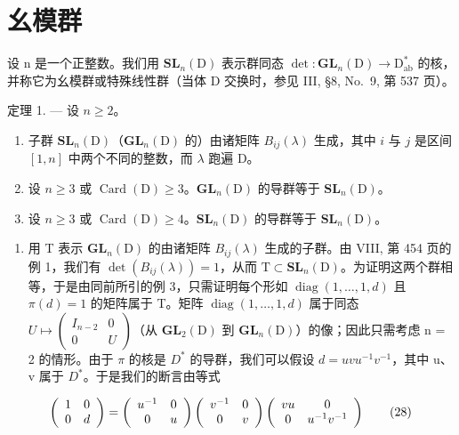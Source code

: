 \section{幺模群}

设 n 是一个正整数。我们用 \(\mathbf{SL}_{n}(\mathrm{D})\) 表示群同态 \(\det: \mathbf{GL}_{n}(\mathrm{D}) \to \mathrm{D}_{\mathrm{ab}}^{*}\) 的核，并称它为幺模群或特殊线性群（当体 D 交换时，参见 III, §8, No.~9, 第 537 页）。

定理 1. --- 设 \(n \geqslant 2\)。

\begin{enumerate}
\def\labelenumi{\alph{enumi})}
\item
  子群 \(\mathbf{SL}_n(\mathrm{D})\)（\(\mathbf{GL}_n(\mathrm{D})\) 的）由诸矩阵 \(B_{ij}(\lambda)\) 生成，其中 \(i\) 与 \(j\) 是区间 \([1,n]\) 中两个不同的整数，而 \(\lambda\) 跑遍 D。
\item
  设 \(n \geqslant 3\) 或 \(\operatorname{Card}(\mathrm{D}) \geqslant 3\)。\(\mathbf{GL}_n(\mathrm{D})\) 的导群等于 \(\mathbf{SL}_n(\mathrm{D})\)。
\item
  设 \(n \geqslant 3\) 或 \(\operatorname{Card}(\mathrm{D}) \geqslant 4\)。\(\mathbf{SL}_n(\mathrm{D})\) 的导群等于 \(\mathbf{SL}_n(\mathrm{D})\)。
\end{enumerate}

\begin{enumerate}
\def\labelenumi{\Alph{enumi})}
\tightlist
\item
  用 T 表示 \(\mathbf{GL}_{n}(\mathrm{D})\) 的由诸矩阵 \(B_{ij}(\lambda)\) 生成的子群。由 VIII, 第 454 页的例 1，我们有 \(\det(B_{ij}(\lambda)) = 1\)，从而 \(\mathrm{T} \subset \mathbf{SL}_{n}(\mathrm{D})\)。为证明这两个群相等，于是由同前所引的例 3，只需证明每个形如 \(\operatorname{diag}(1, \ldots, 1, d)\) 且 \(\pi(d) = 1\) 的矩阵属于 T。矩阵 \(\operatorname{diag}(1, \ldots, 1, d)\) 属于同态 \(U \mapsto \begin{pmatrix} I_{n-2} & 0 \\ 0 & U \end{pmatrix}\)（从 \(\mathbf{GL}_{2}(\mathrm{D})\) 到 \(\mathbf{GL}_{n}(\mathrm{D})\)）的像；因此只需考虑 n = 2 的情形。由于 \(\pi\) 的核是 \(D^{*}\) 的导群，我们可以假设 \(d = uvu^{-1}v^{-1}\)，其中 u、v 属于 \(D^{*}\)。于是我们的断言由等式
\end{enumerate}

\[
\left( \begin{array}{c c} 1 & 0 \\ 0 & d \end{array} \right) = \left( \begin{array}{c c} u ^ {- 1} & 0 \\ 0 & u \end{array} \right) \left( \begin{array}{c c} v ^ {- 1} & 0 \\ 0 & v \end{array} \right) \left( \begin{array}{c c} v u & 0 \\ 0 & u ^ {- 1} v ^ {- 1} \end{array} \right)\tag{28}
\]

